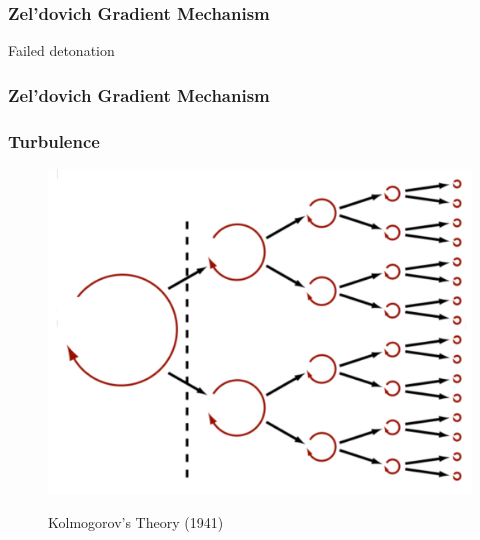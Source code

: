 \documentclass{beamer}
\begin{document}

\begin{frame}
\frametitle{Zel'dovich Gradient Mechanism}
        \vspace{20pt}

        \begin{center}
        \end{center}
        \begin{center}
                Failed detonation
        \end{center}
\end{frame}


\begin{frame}
        \frametitle{Zel'dovich Gradient Mechanism}

        \vspace{20pt}
        \begin{center}

        \caption{Successful Detonation}
        \end{center}

\end{frame}







\begin{frame}
\frametitle{Turbulence}

        \begin{figure}
    \begin{center}
      \includegraphics[width=.70\linewidth]{k41.png}
    \end{center}
		\begin{center}
			Kolmogorov's Theory (1941)
		\end{center}
  \end{figure}


\end{frame}
\end{document}
